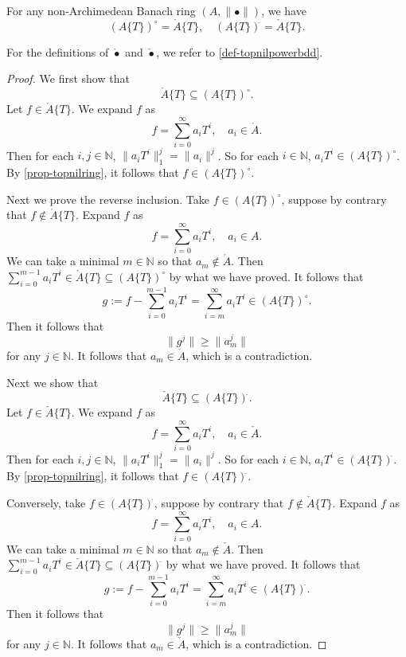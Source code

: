 \begin{proposition}\label{prop-strictlyconvcirccheck}
    For any non-Archimedean Banach ring $(A,\|\bullet\|)$, we have 
    \[
        (A\{T\})^{\circ}=\mathring{A}\{T\},\quad (A\{T\})^{\check{}}=\check{A}\{T\}.  
    \]
\end{proposition}
For the definitions of $\mathring{\bullet}$ and $\check{\bullet}$, we refer to \cref{def-topnilpowerbdd}.
\begin{proof}
    We first show that
    \[
        \mathring{A}\{T\}\subseteq (A\{T\})^{\circ}.
    \]
    Let $f\in \mathring{A}\{T\}$. We expand $f$ as
    \[
        f=\sum_{i=0}^{\infty}a_i T^i,\quad a_i\in  \mathring{A}. 
    \] 
    Then for each $i,j\in \mathbb{N}$, $\|a_iT^i\|_1^j=\|a_i\|^j$. So for each $i\in \mathbb{N}$, $a_iT^i\in (A\{T\})^{\circ}$. By \cref{prop-topnilring}, it follows that $f\in (A\{T\})^{\circ}$.

    Next we prove the reverse inclusion. Take $f\in (A\{T\})^{\circ}$, suppose by contrary that $f\not\in \mathring{A}\{T\}$. Expand $f$ as
    \[
        f=\sum_{i=0}^{\infty}a_i T^i,\quad a_i\in  A. 
    \] 
    We can take a minimal $m\in \mathbb{N}$ so that $a_m\not\in \mathring{A}$. Then $\sum_{i=0}^{m-1}a_iT^i\in \mathring{A}\{T\}\subseteq (A\{T\})^{\circ}$ by what we have proved. It follows that 
    \[
        g:=f-\sum_{i=0}^{m-1}a_iT^i=\sum_{i=m}^{\infty}a_iT^i\in (A\{T\})^{\circ}.
    \]
    Then it follows that
    \[
        \|g^j\|\geq \|a_m^j\|  
    \] 
    for any $j\in \mathbb{N}$. It follows that $a_m\in \mathring{A}$, which is a contradiction.

    Next we show that 
    \[
        \check{A}\{T\}\subseteq (A\{T\})^{\check{}}.
    \]
    Let $f\in \check{A}\{T\}$. We expand $f$ as
    \[
        f=\sum_{i=0}^{\infty}a_i T^i,\quad a_i\in  \check{A}. 
    \] 
    Then for each $i,j\in \mathbb{N}$, $\|a_iT^i\|_1^j=\|a_i\|^j$. So for each $i\in \mathbb{N}$, $a_iT^i\in (A\{T\})^{\check{}}$. By \cref{prop-topnilring}, it follows that $f\in (A\{T\})^{\check{}}$.

    Conversely, take $f\in (A\{T\})^{\check{}}$, suppose by contrary that $f\not\in \check{A}\{T\}$. Expand $f$ as
    \[
        f=\sum_{i=0}^{\infty}a_i T^i,\quad a_i\in  A. 
    \] 
    We can take a minimal $m\in \mathbb{N}$ so that $a_m\not\in \check{A}$. Then $\sum_{i=0}^{m-1}a_iT^i\in \check{A}\{T\}\subseteq (A\{T\})^{\check{}}$ by what we have proved. It follows that 
    \[
        g:=f-\sum_{i=0}^{m-1}a_iT^i=\sum_{i=m}^{\infty}a_iT^i\in (A\{T\})^{\check{}}.
    \]
    Then it follows that
    \[
        \|g^j\|\geq \|a_m^j\|  
    \] 
    for any $j\in \mathbb{N}$. It follows that $a_m\in \check{A}$, which is a contradiction.
\end{proof}

